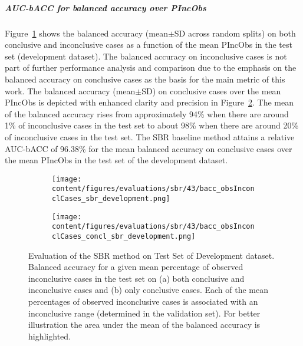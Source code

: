 \subparagraph{AUC-bACC for balanced accuracy over PIncObs}

Figure~\ref{fig:bacc_obsInconclCases_sbr_development} shows the balanced accuracy (mean$\pm$SD across random splits) 
on both conclusive and inconclusive cases as a function of the mean PIncObs
in the test set (development dataset).
The balanced accuracy on inconclusive cases is not part of further performance analysis and comparison 
due to the emphasis on the balanced accuracy on conclusive cases as the basis for the main metric of this work.
The balanced accuracy (mean$\pm$SD) on conclusive cases over the mean PIncObs
is depicted with enhanced clarity and precision in Figure~\ref{fig:bacc_obsInconclCases_concl_sbr_development}.
The mean of the balanced accuracy rises from approximately 94\% 
when there are around 1\% of inconclusive cases in the test set to about 98\% 
when there are around 20\% of inconclusive cases in the test set.
The SBR baseline method attains a relative AUC-bACC of 96.38\% for the mean balanced accuracy on conclusive cases
over the mean PIncObs in the test set of the development dataset.

\begin{figure}[ht]
    \begin{subfigure}{0.5\textwidth}
      \centering
      \texttt{[image: content/figures/evaluations/sbr/43/bacc\_obsInconclCases\_sbr\_development.png]}
      \subcaption{}
      \label{fig:bacc_obsInconclCases_sbr_development}
    \end{subfigure}
    \hfill
    \begin{subfigure}{0.5\textwidth}
      \centering
      \texttt{[image: content/figures/evaluations/sbr/43/bacc\_obsInconclCases\_concl\_sbr\_development.png]}
      \subcaption{}
      \label{fig:bacc_obsInconclCases_concl_sbr_development}
    \end{subfigure}

    \caption{Evaluation of the SBR method on Test Set of Development dataset.
    Balanced accuracy for a given mean percentage of observed inconclusive cases in the test set on 
    (a) both conclusive and inconclusive cases and (b) only conclusive cases. 
    Each of the mean percentages of observed inconclusive cases is associated with an inconclusive range (determined in the validation set).
    For better illustration the area under the mean of the balanced accuracy is highlighted.}
    \label{fig:bacc_obsInconclCases_sbr_development_full}
\end{figure}

